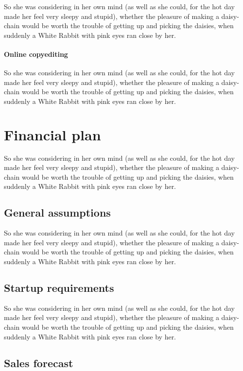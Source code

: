 \documentclass[12pt]{article}
\begin{document}
So she was considering in her own mind (as well as she could, for the hot day made her feel very sleepy and stupid), whether the pleasure of making a daisy-chain would be worth the trouble of getting up and picking the daisies, when suddenly a White Rabbit with pink eyes ran close by her. 

\paragraph{Online copyediting}
\label{sec-4-7-1-3}
So she was considering in her own mind (as well as she could, for the hot day made her feel very sleepy and stupid), whether the pleasure of making a daisy-chain would be worth the trouble of getting up and picking the daisies, when suddenly a White Rabbit with pink eyes ran close by her. 

\section{Financial plan}
\label{sec-5}
So she was considering in her own mind (as well as she could, for the hot day made her feel very sleepy and stupid), whether the pleasure of making a daisy-chain would be worth the trouble of getting up and picking the daisies, when suddenly a White Rabbit with pink eyes ran close by her. 

\subsection{General assumptions}
\label{sec-5-1}
So she was considering in her own mind (as well as she could, for the hot day made her feel very sleepy and stupid), whether the pleasure of making a daisy-chain would be worth the trouble of getting up and picking the daisies, when suddenly a White Rabbit with pink eyes ran close by her. 

\subsection{Startup requirements}
\label{sec-5-2}
So she was considering in her own mind (as well as she could, for the hot day made her feel very sleepy and stupid), whether the pleasure of making a daisy-chain would be worth the trouble of getting up and picking the daisies, when suddenly a White Rabbit with pink eyes ran close by her. 

\subsection{Sales forecast}
\label{sec-5-3}
\end{document}
